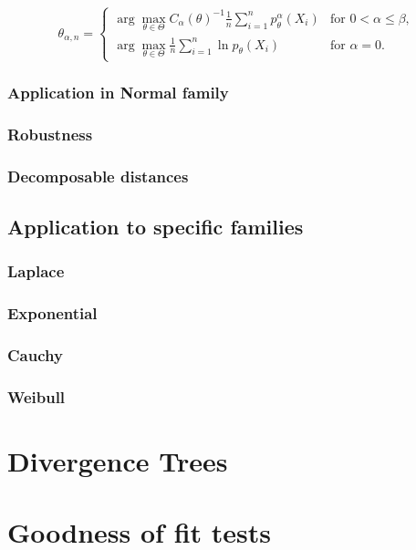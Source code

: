 \begin{equation}
	\theta_{\alpha,n} =
	\begin{cases}
		\displaystyle{ \arg \max_{\theta \in \Theta} C_\alpha\left( \theta \right)^{-1} \frac{1}{n} \sum_{i=1}^n p_{\theta}^{\alpha}\left( X_i \right) } & \text{for } 0 < \alpha \leq \beta, \\
		\displaystyle{ \arg \max_{\theta \in \Theta}  \frac{1}{n} \sum_{i=1}^n \ln p_{\theta}\left( X_i \right) } & \text{for } \alpha = 0.
	\end{cases}	
	\label{JK-Renyi-estimator_formula}
\end{equation}
		
		\subsection{Application in Normal family}
			
		\subsection{Robustness}
		
		\subsection{Decomposable distances}
	
	\section{Application to specific families}

		\subsection{Laplace}
		
		\subsection{Exponential}
		
		\subsection{Cauchy}
		
		\subsection{Weibull}
	
\chapter{Divergence Trees}

\chapter{Goodness of fit tests}